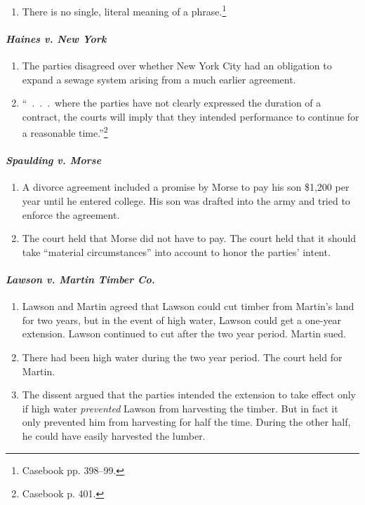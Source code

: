 \begin{enumerate}
    \item There is no single, literal meaning of a phrase.\footnote{Casebook 
    pp. 398--99.}
\end{enumerate}

\paragraph{\emph{Haines v. New York}}

\begin{enumerate}
    \item The parties disagreed over whether New York City had an obligation 
    to expand a sewage system arising from a much earlier agreement.
    \item ``~.~.~.~where the parties have not clearly expressed the duration 
    of a contract, the courts will imply that they intended performance to 
    continue for a reasonable time.''\footnote{Casebook p. 401.}
\end{enumerate}

\paragraph{\emph{Spaulding v. Morse}}

\begin{enumerate}
    \item A divorce agreement included a promise by Morse to pay his son 
    \$1,200 per year until he entered college. His son was drafted into the 
    army and tried to enforce the agreement.
    \item The court held that Morse did not have to pay. The court held that 
    it should take ``material circumstances'' into account to honor the 
    parties' intent.
\end{enumerate}

\paragraph{\emph{Lawson v. Martin Timber Co.}}

\begin{enumerate}
    \item Lawson and Martin agreed that Lawson could cut timber from Martin's 
    land for two years, but in the event of high water, Lawson could get a 
    one-year extension. Lawson continued to cut after the two year period. 
    Martin sued.
    \item There had been high water during the two year period. The court held 
    for Martin.
    \item The dissent argued that the parties intended the extension to take 
    effect only if high water \emph{prevented} Lawson from harvesting the 
    timber. But in fact it only prevented him from harvesting for half the 
    time. During the other half, he could have easily harvested the lumber.
\end{enumerate}

